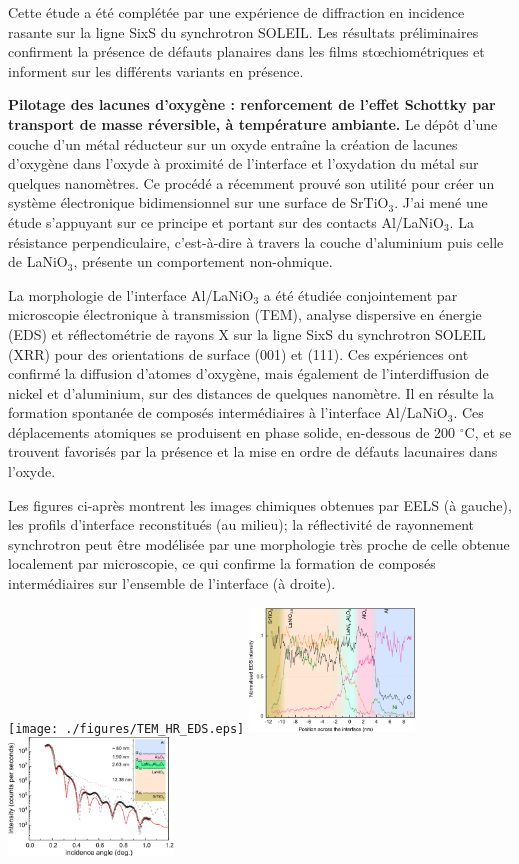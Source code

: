 Cette étude a été complétée par une expérience de diffraction en incidence rasante sur la ligne SixS du synchrotron SOLEIL.
Les résultats préliminaires confirment la présence de défauts planaires dans les films st\oe chiométriques et informent sur les différents variants en présence.



\textbf{Pilotage des lacunes d'oxygène : renforcement de l'effet Schottky par transport de masse réversible, à température ambiante.}
Le dépôt d'une couche d'un métal réducteur sur un oxyde entraîne la création de lacunes d'oxygène dans l'oxyde à proximité de l'interface et l'oxydation du métal sur quelques nanomètres.
Ce procédé a récemment prouvé son utilité pour créer un système électronique bidimensionnel sur une surface de SrTiO$_3$. J'ai mené une étude s'appuyant sur ce principe et portant sur des contacts Al/LaNiO$_3$. La résistance perpendiculaire, c'est-à-dire à travers la couche d'aluminium puis celle de LaNiO$_3$, présente un comportement non-ohmique.

La morphologie de l'interface Al/LaNiO$_3$ a été étudiée conjointement par microscopie électronique à transmission (TEM), analyse dispersive en énergie (EDS) et réflectométrie de rayons X sur la ligne SixS du synchrotron SOLEIL (XRR) pour des orientations de surface (001) et (111).
Ces expériences ont confirmé la diffusion d'atomes d'oxygène, mais également de l'interdiffusion de nickel et d'aluminium, sur des distances de quelques nanomètre.
Il en résulte la formation spontanée de composés intermédiaires à l'interface Al/LaNiO$_3$.
Ces déplacements atomiques se produisent en phase solide, en-dessous de 200 $^\circ$C, et se trouvent favorisés par la présence et la mise en ordre de défauts lacunaires dans l'oxyde.

Les figures ci-après montrent les images chimiques obtenues par EELS (à gauche), les profils d'interface reconstitués (au milieu); la réflectivité de rayonnement synchrotron peut être modélisée par une morphologie très proche de celle obtenue localement par microscopie, ce qui confirme la formation de composés intermédiaires sur l'ensemble de l'interface (à droite).
\par
\texttt{[image: ./figures/TEM\_HR\_EDS.eps]}
\includegraphics[width=0.33\textwidth]{./figures/TEM_EDS_profiles_inverted.eps}
\includegraphics[width=0.33\textwidth]{./figures/XRR_OFFState3.eps}

